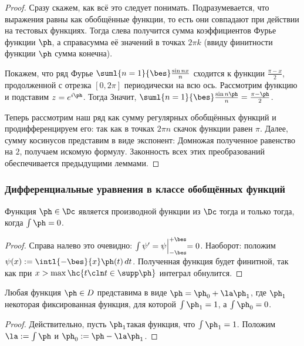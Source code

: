 \documentclass[a4paper]{article}
\newcommand{\Bsub}[2]{\Bigl|_{#1}^{#2}}
\newcommand{\dt}{\,dt}
\begin{document}
\begin{theorem}
\end{theorem}
\begin{proof}
Сразу скажем, как всё это следует понимать. Подразумевается, что выражения равны как обобщённые функции, то есть
они совпадают при действии на тестовых функциях. Тогда слева получится сумма коэффициентов Фурье функции $\ph$,
а справа\т сумма её значений в точках $2\pi k$ (ввиду финитности функции $\ph$ сумма конечна).

Покажем, что ряд Фурье $\suml{n=1}{\bes}\frac{\sin nx}{n}$ сходится к функции $\frac{\pi-x}{2}$, продолженной
с отрезка $[0,2\pi]$ периодически на всю ось. Рассмотрим функцию
и подставим $z = e^{i\ph}$. Тогда
Значит, $\suml{n=1}{\bes}\frac{\sin n\ph}{n} = \frac{\pi-\ph}{2}$.

Теперь рассмотрим наш ряд как сумму регулярных обобщённых функций и продифференцируем его:
так как в точках $2\pi n$ скачок функции равен $\pi$. Далее, сумму косинусов представим в виде экспонент:
Домножая полученное равенство на $2$, получаем искомую формулу. Законность всех этих преобразований обеспечивается
предыдущими леммами.
\end{proof}

\subsubsection{Дифференциальные уравнения в классе обобщённых функций}

\begin{lemma}
Функция $\ph \in \Dc$ является производной функции из $\Dc$ тогда и только тогда, когда $\int \ph = 0$.
\end{lemma}
\begin{proof}
Справа налево это очевидно: $\int \psi' =\psi\Bsub{-\bes}{+\bes} = 0$. Наоборот: положим
$\psi(x) := \intl{-\bes}{x}\ph(t)\dt$. Полученная функция будет финитной, так как при $x > \max \hc{t\cln t\in \supp \ph}$
интеграл обнулится.
\end{proof}
\begin{imp}
Любая функция $\ph\in D$ представима в виде $\ph = \ph_0 + \la \ph_1$, где $\ph_1$\т некоторая фиксированная
функция, для которой $\int \ph_1 = 1$, а $\int \ph_0 = 0$.
\end{imp}
\begin{proof}
Действительно, пусть $\ph_1$\т такая функция, что $\int \ph_1 =1$. Положим
$\la := \int\ph$ и $\ph_0 := \ph - \la \ph_1$.
\end{proof}
\end{document}
